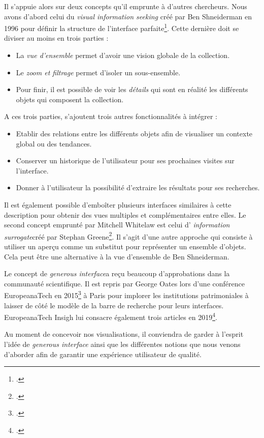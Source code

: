 Il s'appuie alors sur deux concepts qu'il emprunte à d'autres chercheurs. 
Nous avons d'abord celui du \og \textit{visual information seeking} \fg créé par Ben Shneiderman en 1996 pour définir la structure de l'interface parfaite\footcite{shneidermanEyesHaveIt1996}. Cette dernière doit se diviser au moins en trois parties : 

\begin{itemize}
	\item La \textit{vue d'ensemble} permet d'avoir une vision globale de la collection.
	\item Le \textit{zoom et filtrage} permet d'isoler un sous-ensemble.
	\item Pour finir, il est possible de voir les \textit{détails} qui sont en réalité les différents objets qui composent la collection.
\end{itemize}
A ces trois parties, s'ajoutent trois autres fonctionnalités à intégrer : 

\begin{itemize}
	\item Etablir des relations entre les différents objets afin de visualiser un contexte global ou des tendances.
	\item Conserver un historique de l'utilisateur pour ses prochaines visites sur l'interface.
	\item Donner à l'utilisateur la possibilité d'extraire les résultats pour ses recherches.
\end{itemize}
Il est également possible d'emboîter plusieurs interfaces similaires à cette description pour obtenir des vues multiples et complémentaires entre elles.
Le second concept emprunté par Mitchell Whitelaw est celui d' \og \textit{information surrogate}\fg créé par Stephan
Greene\footcite{greenePreviewsOverviewsDigital2000}. Il s'agit d'une autre approche qui consiste à utiliser un aperçu comme un substitut pour représenter un ensemble d'objets. Cela peut être une alternative à la vue d'ensemble de Ben Shneiderman.

Le concept de \og \textit{generous interface}\fg a reçu beaucoup d'approbations dans la communauté scientifique. Il est repris par George Oates lors d'une conférence EuropeanaTech en 2015\footcite{EuropeanaTech2015} à Paris pour implorer les institutions patrimoniales à laisser de côté le modèle de la barre de recherche pour leurs interfaces. EuropeanaTech Insigh lui consacre également trois articles en 2019\footcite{Issue11Generous}.

Au moment de concevoir nos visualisations, il conviendra de garder à l'esprit l'idée de \textit{generous interface} ainsi que les différentes notions que nous venons d'aborder afin de garantir une expérience utilisateur de qualité.

